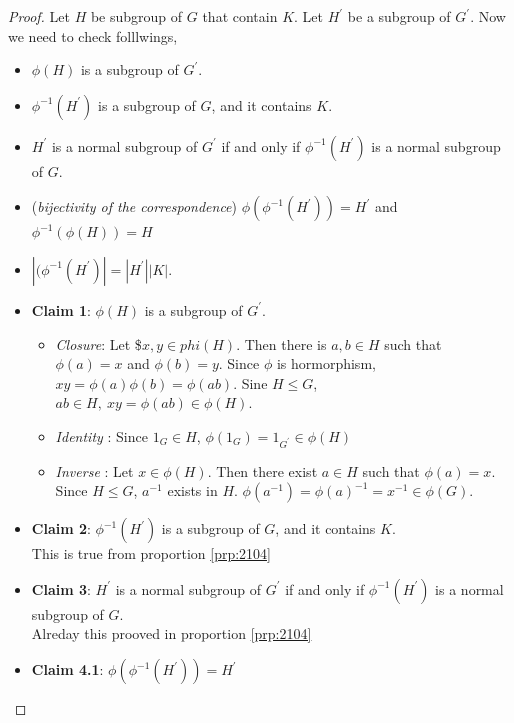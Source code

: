 \documentclass[
]{book}
\providecommand{\tightlist}{%
  \setlength{\itemsep}{0pt}\setlength{\parskip}{0pt}}
\theoremstyle{definition}
\theoremstyle{definition}
\theoremstyle{definition}
\theoremstyle{definition}
\theoremstyle{remark}
\begin{document}
\begin{proof}
Let \(H\) be subgroup of \(G\) that contain \(K\). Let \(H^\prime\) be a subgroup of \(G^\prime\). Now we need to check folllwings,

\begin{itemize}
\item
  \(\phi(H)\) is a subgroup of \(G^\prime\).
\item
  \(\phi^{-1}(H^\prime)\) is a subgroup of \(G\), and it contains \(K\).
\item
  \(H^\prime\) is a normal subgroup of \(G^\prime\) if and only if \(\phi^{-1}(H^\prime)\) is a normal subgroup of \(G\).
\item
  (\emph{bijectivity of the correspondence}) \(\phi(\phi^{-1}(H^\prime)) =H^\prime\) and \(\phi^{-1}(\phi(H))=H\)
\item
  \(|(\phi^{-1} (H^\prime)| = |H^\prime||K|\).
\item
  \textbf{Claim 1}: \(\phi(H)\) is a subgroup of \(G^\prime\).\\

  \begin{itemize}
  \tightlist
  \item
    \emph{Closure}: Let \$\(x,y\in phi(H)\). Then there is \(a,b\in H\) such that \(\phi(a)=x\) and \(\phi(b)=y\). Since \(\phi\) is hormorphism, \(xy=\phi(a)\phi(b)=\phi(ab)\). Sine \(H\leq G\), \(ab\in H,~ xy=\phi(ab)\in \phi(H)\).
  \item
    \emph{Identity} : Since \(1_G\in H\), \(\phi(1_G)=1_{G^\prime}\in \phi(H)\)
  \item
    \emph{Inverse} : Let \(x\in \phi(H)\). Then there exist \(a\in H\) such that \(\phi(a)=x\). Since \(H\leq G\), \(a^{-1}\) exists in \(H\). \(\phi(a^{-1})=\phi(a)^{-1}=x^{-1}\in \phi(G)\).
  \end{itemize}
\item
  \textbf{Claim 2}: \(\phi^{-1}(H^\prime)\) is a subgroup of \(G\), and it contains \(K\).\\
  This is true from proportion \ref{prp:2104}
\item
  \textbf{Claim 3}: \(H^\prime\) is a normal subgroup of \(G^\prime\) if and only if \(\phi^{-1}(H^\prime)\) is a normal subgroup of \(G\).\\
  Alreday this prooved in proportion \ref{prp:2104}
\item
  \textbf{Claim 4.1}: \(\phi(\phi^{-1}(H^\prime))=H^\prime\)


\end{itemize}
\end{proof}
\end{document}
